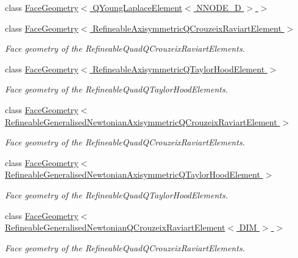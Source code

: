 \begin{DoxyCompactItemize}
\item 
class \hyperlink{classoomph_1_1FaceGeometry_3_01QYoungLaplaceElement_3_01NNODE__1D_01_4_01_4}{Face\+Geometry$<$ Q\+Young\+Laplace\+Element$<$ N\+N\+O\+D\+E\+\_\+D $>$ $>$}
\item 
class \hyperlink{classoomph_1_1FaceGeometry_3_01RefineableAxisymmetricQCrouzeixRaviartElement_01_4}{Face\+Geometry$<$ Refineable\+Axisymmetric\+Q\+Crouzeix\+Raviart\+Element $>$}
\begin{DoxyCompactList}\small\item\em Face geometry of the Refineable\+Quad\+Q\+Crouzeix\+Raviart\+Elements. \end{DoxyCompactList}\item 
class \hyperlink{classoomph_1_1FaceGeometry_3_01RefineableAxisymmetricQTaylorHoodElement_01_4}{Face\+Geometry$<$ Refineable\+Axisymmetric\+Q\+Taylor\+Hood\+Element $>$}
\begin{DoxyCompactList}\small\item\em Face geometry of the Refineable\+Quad\+Q\+Taylor\+Hood\+Elements. \end{DoxyCompactList}\item 
class \hyperlink{classoomph_1_1FaceGeometry_3_01RefineableGeneralisedNewtonianAxisymmetricQCrouzeixRaviartElement_01_4}{Face\+Geometry$<$ Refineable\+Generalised\+Newtonian\+Axisymmetric\+Q\+Crouzeix\+Raviart\+Element $>$}
\begin{DoxyCompactList}\small\item\em Face geometry of the Refineable\+Quad\+Q\+Crouzeix\+Raviart\+Elements. \end{DoxyCompactList}\item 
class \hyperlink{classoomph_1_1FaceGeometry_3_01RefineableGeneralisedNewtonianAxisymmetricQTaylorHoodElement_01_4}{Face\+Geometry$<$ Refineable\+Generalised\+Newtonian\+Axisymmetric\+Q\+Taylor\+Hood\+Element $>$}
\begin{DoxyCompactList}\small\item\em Face geometry of the Refineable\+Quad\+Q\+Taylor\+Hood\+Elements. \end{DoxyCompactList}\item 
class \hyperlink{classoomph_1_1FaceGeometry_3_01RefineableGeneralisedNewtonianQCrouzeixRaviartElement_3_01DIM_01_4_01_4}{Face\+Geometry$<$ Refineable\+Generalised\+Newtonian\+Q\+Crouzeix\+Raviart\+Element$<$ D\+I\+M $>$ $>$}
\begin{DoxyCompactList}\small\item\em Face geometry of the Refineable\+Quad\+Q\+Crouzeix\+Raviart\+Elements. \end{DoxyCompactList}\item 

\end{DoxyCompactItemize}
